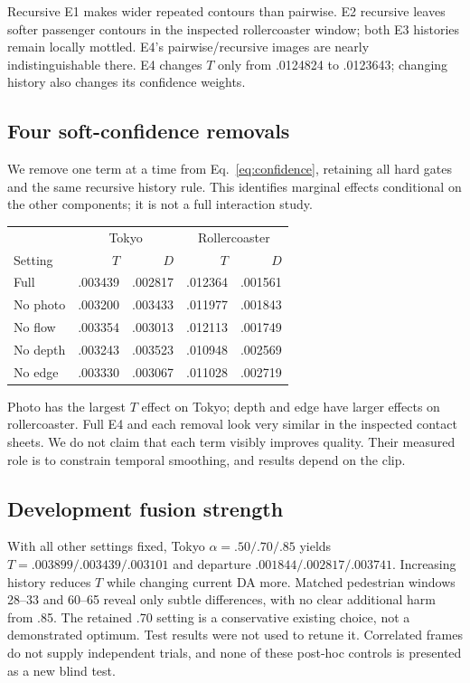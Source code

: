 \documentclass[10pt,twocolumn,letterpaper]{article}
\begin{document}
Recursive E1 makes wider repeated contours than pairwise. E2 recursive leaves softer passenger contours in the inspected rollercoaster window; both E3 histories remain locally mottled. E4's pairwise/recursive images are nearly indistinguishable there. E4 changes $T$ only from .0124824 to .0123643; changing history also changes its confidence weights.


\subsection{Four soft-confidence removals}
We remove one term at a time from Eq.~\ref{eq:confidence}, retaining all hard gates and the same recursive history rule. This identifies marginal effects conditional on the other components; it is not a full interaction study.

\begin{center}\begin{minipage}{\linewidth}\centering
{}
\small
\begin{tabular}{lrrrr}
\toprule
&\multicolumn{2}{c}{Tokyo}&\multicolumn{2}{c}{Rollercoaster}\\
Setting &$T$&$D$&$T$&$D$\\
\midrule
Full&.003439&.002817&.012364&.001561\\
No photo&.003200&.003433&.011977&.001843\\
No flow&.003354&.003013&.012113&.001749\\
No depth&.003243&.003523&.010948&.002569\\
No edge&.003330&.003067&.011028&.002719\\
\bottomrule
\end{tabular}
\end{minipage}\end{center}

Photo has the largest $T$ effect on Tokyo; depth and edge have larger effects on rollercoaster. Full E4 and each removal look very similar in the inspected contact sheets. We do not claim that each term visibly improves quality. Their measured role is to constrain temporal smoothing, and results depend on the clip.

\subsection{Development fusion strength}
With all other settings fixed, Tokyo $\alpha=.50/.70/.85$ yields $T=.003899/.003439/.003101$ and departure $.001844/.002817/.003741$. Increasing history reduces $T$ while changing current DA more. Matched pedestrian windows 28--33 and 60--65 reveal only subtle differences, with no clear additional harm from .85. The retained .70 setting is a conservative existing choice, not a demonstrated optimum. Test results were not used to retune it. Correlated frames do not supply independent trials, and none of these post-hoc controls is presented as a new blind test.
\end{document}

